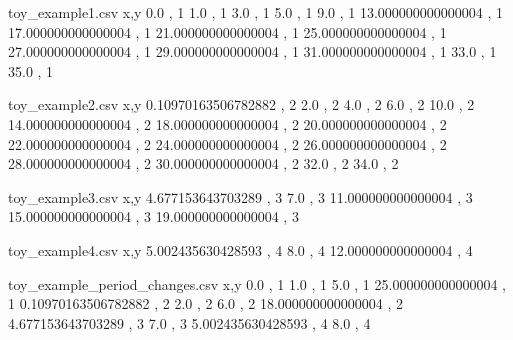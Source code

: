 \begin{filecontents}{toy_example1.csv}
 x,y
0.0 , 1
1.0 , 1
3.0 , 1
5.0 , 1
9.0 , 1
13.000000000000004 , 1
17.000000000000004 , 1
21.000000000000004 , 1
25.000000000000004 , 1
27.000000000000004 , 1
29.000000000000004 , 1
31.000000000000004 , 1
33.0 , 1
35.0 , 1
\end{filecontents}
\begin{filecontents}{toy_example2.csv}
 x,y
0.10970163506782882 , 2
2.0 , 2
4.0 , 2
6.0 , 2
10.0 , 2
14.000000000000004 , 2
18.000000000000004 , 2
20.000000000000004 , 2
22.000000000000004 , 2
24.000000000000004 , 2
26.000000000000004 , 2
28.000000000000004 , 2
30.000000000000004 , 2
32.0 , 2
34.0 , 2
\end{filecontents}
\begin{filecontents}{toy_example3.csv}
 x,y
4.677153643703289 , 3
7.0 , 3
11.000000000000004 , 3
15.000000000000004 , 3
19.000000000000004 , 3
\end{filecontents}
\begin{filecontents}{toy_example4.csv}
 x,y
5.002435630428593 , 4
8.0 , 4
12.000000000000004 , 4
\end{filecontents}
\begin{filecontents}{toy_example_period_changes.csv}
x,y
0.0 , 1
1.0 , 1
5.0 , 1
25.000000000000004 , 1
0.10970163506782882 , 2
2.0 , 2
6.0 , 2
18.000000000000004 , 2
4.677153643703289 , 3
7.0 , 3
5.002435630428593 , 4
8.0 , 4
\end{filecontents}